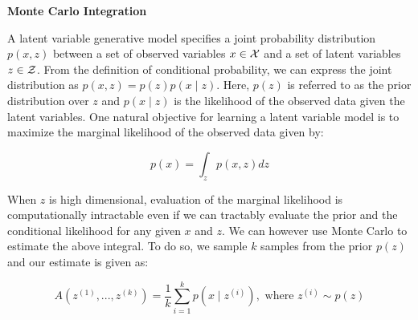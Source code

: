 \item {\bf Monte Carlo Integration}

A latent variable generative model specifies a joint probability distribution $p(x,z)$ between a set of observed 
variables $x \in \mathcal{X}$ and a set of latent variables $z \in \mathcal{Z}$. From the definition of conditional probability, 
we can express the joint distribution as $p(x, z) = p(z)p(x \mid z)$. Here, $p(z)$ is referred to as the 
prior distribution over $z$ and $p(x \mid z)$ is the likelihood of the observed data given the latent variables. 
One natural objective for learning a latent variable model is to maximize the marginal likelihood of the observed data given by:

\begin{equation} \label{eq:12}
    p(x) = \int_z p(x,z)dz
\end{equation}

When $z$ is high dimensional, evaluation of the marginal likelihood is computationally intractable even if we can 
tractably evaluate the prior and the conditional likelihood for any given $x$ and $z$. We can however 
use Monte Carlo to estimate the above integral. To do so, we sample $k$ samples from the prior $p(z)$ 
and our estimate is given as:

\begin{equation} \label{eq:13}
    A(z^{(1)},...,z^{(k)}) = \frac{1}{k} \sum_{i=1}^{k} p(x \mid z^{(i)}), \text{ where } z^{(i)} \sim p(z)
\end{equation}

\begin{enumerate}

  

  

\end{enumerate}

